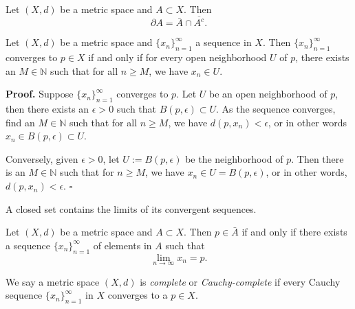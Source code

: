 \documentclass[../main.tex]{subfiles}
\begin{document}
        \begin{corollary} \label{cor:boundary_closure}
        Let \( (X, d) \) be a metric space and \( A \subset X \). Then
        \[
        \partial A = \bar{A} \cap \overline{A^c}.
        \]
        \end{corollary}
        
        \begin{proposition} \label{prop:sequence_convergence}
        Let \( (X, d) \) be a metric space and \( \{ x_n \}_{n=1}^{\infty} \) a sequence in \( X \). Then \( \{ x_n \}_{n=1}^{\infty} \) converges to \( p \in X \) if and only if for every open neighborhood \( U \) of \( p \), there exists an \( M \in \mathbb{N} \) such that for all \( n \geq M \), we have \( x_n \in U \).
        
        \textbf{Proof.} Suppose \( \{ x_n \}_{n=1}^{\infty} \) converges to \( p \). Let \( U \) be an open neighborhood of \( p \), then there exists an \( \epsilon > 0 \) such that \( B(p, \epsilon) \subset U \). As the sequence converges, find an \( M \in \mathbb{N} \) such that for all \( n \geq M \), we have \( d(p, x_n) < \epsilon \), or in other words \( x_n \in B(p, \epsilon) \subset U \).
        
        Conversely, given \( \epsilon > 0 \), let \( U := B(p, \epsilon) \) be the neighborhood of \( p \). Then there is an \( M \in \mathbb{N} \) such that for \( n \geq M \), we have \( x_n \in U = B(p, \epsilon) \), or in other words, \( d(p, x_n) < \epsilon \). \(\square\)
        
        A closed set contains the limits of its convergent sequences.
        \end{proposition}
        
        \begin{proposition} \label{prop:sequence_closure}
        Let \( (X, d) \) be a metric space and \( A \subset X \). Then \( p \in \bar{A} \) if and only if there exists a sequence \( \{ x_n \}_{n=1}^{\infty} \) of elements in \( A \) such that
        \[
        \lim_{n \to \infty} x_n = p.
        \]
        \end{proposition}
        

        \begin{definition} \label{def:complete_space}
            We say a metric space \( (X, d) \) is \textit{complete} or \textit{Cauchy-complete} if every Cauchy sequence \( \{x_n\}_{n=1}^{\infty} \) in \( X \) converges to a \( p \in X \).
            \end{definition}
            
\end{document}
